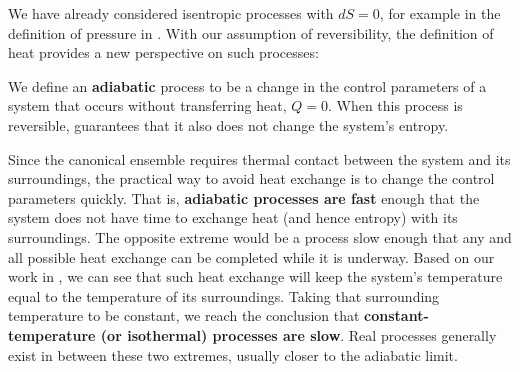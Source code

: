 We have already considered isentropic processes with $dS = 0$, for example in the definition of pressure in .
With our assumption of reversibility, the definition of heat provides a new perspective on such processes:

\begin{shaded}
  We define an \textbf{adiabatic} process to be a change in the control parameters of a system that occurs without transferring heat, $Q = 0$.
  When this process is reversible,  guarantees that it also does not change the system's entropy.
\end{shaded}

Since the canonical ensemble requires thermal contact between the system and its surroundings, the practical way to avoid heat exchange is to change the control parameters quickly.
That is, \textbf{adiabatic processes are fast} enough that the system does not have time to exchange heat (and hence entropy) with its surroundings.
The opposite extreme would be a process slow enough that any and all possible heat exchange can be completed while it is underway.
Based on our work in , we can see that such heat exchange will keep the system's temperature equal to the temperature of its surroundings.
Taking that surrounding temperature to be constant, we reach the conclusion that \textbf{constant-temperature (or isothermal) processes are slow}.
Real processes generally exist in between these two extremes, usually closer to the adiabatic limit.



